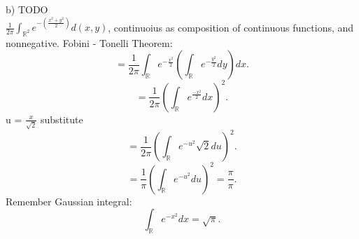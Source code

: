 \begin{exercise}[9.7]
    \label{ex:9.7}
    b) TODO\\
    $\frac{1}{2\pi} \int_{\mathbb{R}^{2}} e^{-(\frac{x^{2}+y^{2}}{2})}d(x,y)$, continuoius as composition of continuous
    functions, and nonnegative. Fobini - Tonelli Theorem:
    \[
    = \frac{1}{2\pi} \int_{\mathbb{R}} e^{-\frac{x^{2}}{2}} (\int_{\mathbb{R}} e^{-\frac{y^{2}}{2}}dy) dx
    .\] 
    \[
    = \frac{1}{2\pi} (\int_{\mathbb{R}} e^{\frac{-x^{2}}{2}} dx)^{2}
    .\] 
    u = $\frac{x}{\sqrt{2} }$ substitute
    \[
    = \frac{1}{2\pi} (\int_{\mathbb{R}} e^{-u^{2}} \sqrt{2} du)^{2}
    .\] 
    \[
    = \frac{1}{\pi} (\int_{\mathbb{R}} e^{-u^{2}}du)^{2} = \frac{\pi}{\pi}
    .\] 
    Remember Gaussian integral:
    \[
    \int_{\mathbb{R}} e^{-x^{2}}dx = \sqrt{\pi} 
    .\] 
\end{exercise}


